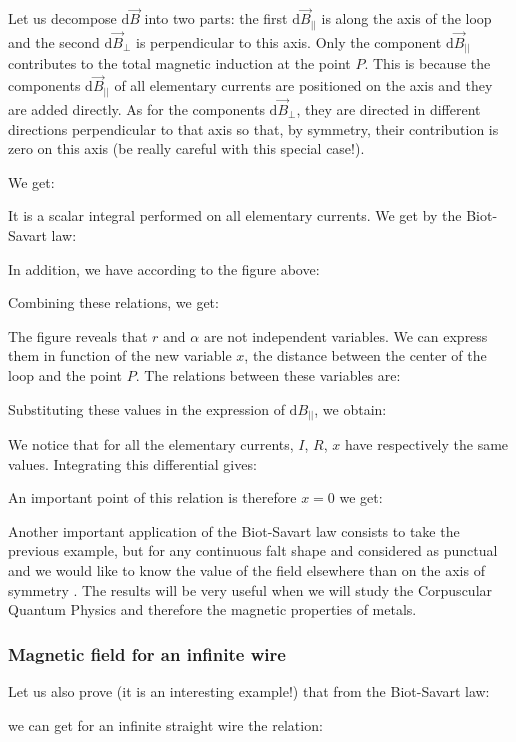 	Let us decompose $\mathrm{d}\vec{B}$ into two parts: the first $\mathrm{d}\vec{B}_{||}$ is along the axis of the loop and the second $\mathrm{d}\vec{B}_{\perp}$ is perpendicular to this axis. Only the component $\mathrm{d}\vec{B}_{||}$ contributes to the total magnetic induction at the point $P$. This is because the components $\mathrm{d}\vec{B}_{||}$ of all elementary currents are positioned on the axis and they are added directly. As for the components $\mathrm{d}\vec{B}_{\perp}$, they are directed in different directions perpendicular to that axis so that, by symmetry, their contribution is zero on this axis (be really careful with this special case!).
	
	 We get:
	
	It is a scalar integral performed on all elementary currents. We get by the Biot-Savart law:
	
	In addition, we have according to the figure above:
	
	Combining these relations, we get:
	
	The figure reveals that $r$ and $\alpha$ are not independent variables. We can express them in function of the new variable $x$, the distance between the center of the loop and the point $P$. The relations between these variables are:
	
	Substituting these values in the expression of $\mathrm{d}B_{||}$, we obtain:
	
	We notice that for all the elementary currents, $I$, $R$, $x$ have respectively the same values. Integrating this differential gives:
	
	An important point of this relation is therefore $x=0$ we get:
	
	Another important application of the Biot-Savart law consists to take the previous example, but for any continuous falt shape and considered as punctual and we would like to know the value of the field elsewhere than on the axis of symmetry . The results will be very useful when we will study the Corpuscular Quantum Physics and therefore the magnetic properties of metals.
	
	\subsubsection{Magnetic field for an infinite wire}
	Let us also prove (it is an interesting example!) that from the Biot-Savart law:
	
	we can get for an infinite straight wire the relation:
	
